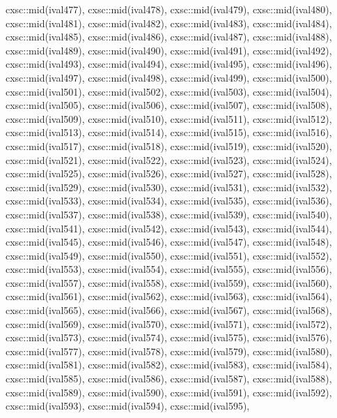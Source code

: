 \begin{DoxyCode}
{  cxsc::mid(ival477),
  cxsc::mid(ival478),
  cxsc::mid(ival479),
  cxsc::mid(ival480),
  cxsc::mid(ival481),
  cxsc::mid(ival482),
  cxsc::mid(ival483),
  cxsc::mid(ival484),
  cxsc::mid(ival485),
  cxsc::mid(ival486),
  cxsc::mid(ival487),
  cxsc::mid(ival488),
  cxsc::mid(ival489),
  cxsc::mid(ival490),
  cxsc::mid(ival491),
  cxsc::mid(ival492),
  cxsc::mid(ival493),
  cxsc::mid(ival494),
  cxsc::mid(ival495),
  cxsc::mid(ival496),
  cxsc::mid(ival497),
  cxsc::mid(ival498),
  cxsc::mid(ival499),
  cxsc::mid(ival500),
  cxsc::mid(ival501),
  cxsc::mid(ival502),
  cxsc::mid(ival503),
  cxsc::mid(ival504),
  cxsc::mid(ival505),
  cxsc::mid(ival506),
  cxsc::mid(ival507),
  cxsc::mid(ival508),
  cxsc::mid(ival509),
  cxsc::mid(ival510),
  cxsc::mid(ival511),
  cxsc::mid(ival512),
  cxsc::mid(ival513),
  cxsc::mid(ival514),
  cxsc::mid(ival515),
  cxsc::mid(ival516),
  cxsc::mid(ival517),
  cxsc::mid(ival518),
  cxsc::mid(ival519),
  cxsc::mid(ival520),
  cxsc::mid(ival521),
  cxsc::mid(ival522),
  cxsc::mid(ival523),
  cxsc::mid(ival524),
  cxsc::mid(ival525),
  cxsc::mid(ival526),
  cxsc::mid(ival527),
  cxsc::mid(ival528),
  cxsc::mid(ival529),
  cxsc::mid(ival530),
  cxsc::mid(ival531),
  cxsc::mid(ival532),
  cxsc::mid(ival533),
  cxsc::mid(ival534),
  cxsc::mid(ival535),
  cxsc::mid(ival536),
  cxsc::mid(ival537),
  cxsc::mid(ival538),
  cxsc::mid(ival539),
  cxsc::mid(ival540),
  cxsc::mid(ival541),
  cxsc::mid(ival542),
  cxsc::mid(ival543),
  cxsc::mid(ival544),
  cxsc::mid(ival545),
  cxsc::mid(ival546),
  cxsc::mid(ival547),
  cxsc::mid(ival548),
  cxsc::mid(ival549),
  cxsc::mid(ival550),
  cxsc::mid(ival551),
  cxsc::mid(ival552),
  cxsc::mid(ival553),
  cxsc::mid(ival554),
  cxsc::mid(ival555),
  cxsc::mid(ival556),
  cxsc::mid(ival557),
  cxsc::mid(ival558),
  cxsc::mid(ival559),
  cxsc::mid(ival560),
  cxsc::mid(ival561),
  cxsc::mid(ival562),
  cxsc::mid(ival563),
  cxsc::mid(ival564),
  cxsc::mid(ival565),
  cxsc::mid(ival566),
  cxsc::mid(ival567),
  cxsc::mid(ival568),
  cxsc::mid(ival569),
  cxsc::mid(ival570),
  cxsc::mid(ival571),
  cxsc::mid(ival572),
  cxsc::mid(ival573),
  cxsc::mid(ival574),
  cxsc::mid(ival575),
  cxsc::mid(ival576),
  cxsc::mid(ival577),
  cxsc::mid(ival578),
  cxsc::mid(ival579),
  cxsc::mid(ival580),
  cxsc::mid(ival581),
  cxsc::mid(ival582),
  cxsc::mid(ival583),
  cxsc::mid(ival584),
  cxsc::mid(ival585),
  cxsc::mid(ival586),
  cxsc::mid(ival587),
  cxsc::mid(ival588),
  cxsc::mid(ival589),
  cxsc::mid(ival590),
  cxsc::mid(ival591),
  cxsc::mid(ival592),
  cxsc::mid(ival593),
  cxsc::mid(ival594),
  cxsc::mid(ival595),
}
\end{DoxyCode}
